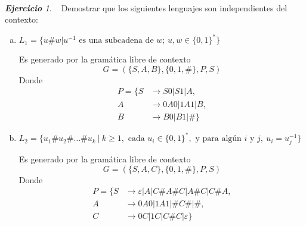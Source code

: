 \documentclass[12pt,spanish]{article}
\theoremstyle{definition}
\theoremstyle{remark}
\newtheorem{exercise}{\textbf{Ejercicio}}%
\begin{document}
~

\begin{exercise}~ Demostrar que los siguientes lenguajes son
  independientes del contexto:

  \begin{enumerate}[a)]
  \item $L_1=\{u \# w|u^{-1} \text{ es una subcadena de $w$; } u,w \in \{0,1\}^*\}$
    
    Es generado por la gramática libre de
    contexto \[G=(\{S,A,B\},\{0,1,\#\},P,S)\] Donde \vspace{-5mm}
    \begin{align*}
      P=\{S&\rightarrow S0|S1|A, \\
      A&\rightarrow 0A0|1A1|B, \\
      B&\rightarrow B0|B1|\#\}
    \end{align*}

  \item $L_2=\{u_1\# u_2\#\ldots\# u_k \ |\ k\geq 1, \text{ cada } u_i \in \{0,1\}^*, \text{ y para algún } i \text{ y } j,\ u_i = u_j^{-1}\}$

    Es generado por la gramática libre de
    contexto \[G=(\{S,A,C\},\{0,1,\#\},P,S)\] Donde \vspace{-5mm}
    \begin{align*}
      P=\{S&\rightarrow \varepsilon|A|C\# A\# C|A\# C|C\# A, \\
      A&\rightarrow 0A0|1A1|\# C\#|\#, \\
      C&\rightarrow 0C|1C|C\# C| \varepsilon\}
    \end{align*}
  \end{enumerate}
\end{exercise}

\setcounter{exercise}{18}

~
\end{document}
